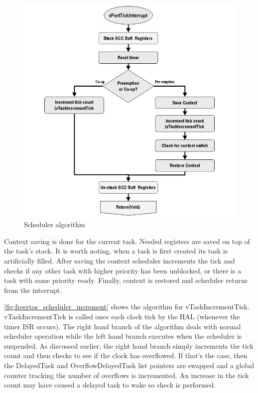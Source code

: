 \begin{figure}[H]

      \centering
      \includegraphics[width=0.8\linewidth]{images/freertos_scheduler_overview.png}
      \caption{Scheduler algorithm\citep[p~20]{freertos_inner_workings}}
      \label{fig:freertos_scheduler_overview}
    
\end{figure}

Context saving is done for the current task. Needed registers are saved on top of the task's stack. It is worth noting, when a task is first created its task is artificially filled. After saving the context scheduler increments the tick and checks if any other task with higher priority has been unblocked, or there is a task with same priority ready. Finally, context is restored and scheduler returns from the interrupt.  

\autoref{fig:freertos_scheduler_increment} shows the algorithm for vTaskIncrementTisk. vTaskIncrementTick is called once each clock tick by the HAL (whenever the timer ISR occurs). The right hand
branch of the algorithm deals with normal scheduler operation while the left hand branch
executes when the scheduler is suspended. As discussed earlier, the right hand branch
simply increments the tick count and then checks to see if the clock has overflowed. If
that’s the case, then the DelayedTask and OverflowDelayedTask list pointers are
swapped and a global counter tracking the number of overflows is incremented. An
increase in the tick count may have caused a delayed task to wake so check is performed.


